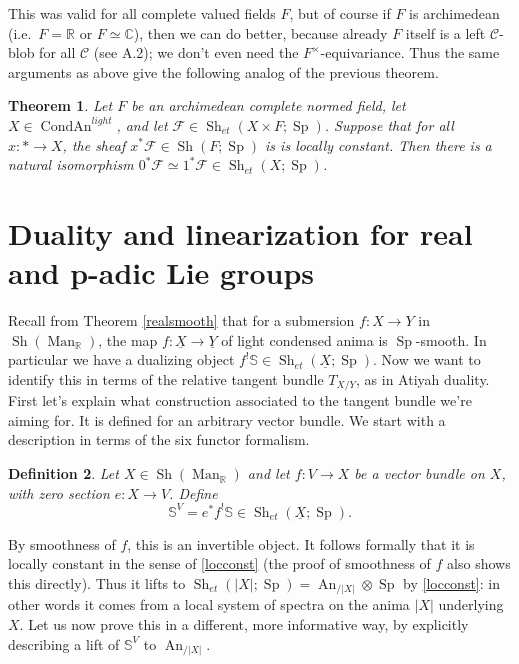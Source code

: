 \documentclass[12pt]{article}
\newtheorem{theorem}{Theorem}[section]
\newtheorem{definition}[theorem]{Definition}
\newcommand{\on}{\operatorname}
\newcommand{\mbb}{\mathbb}
\newcommand{\ul}{\underline}
\begin{document}
This was valid for all complete valued fields $F$, but of course if $F$ is archimedean (i.e.\ $F=\mathbb{R}$ or $F\simeq\mathbb{C}$), then we can do better, because already $F$ itself is a left $\mathcal{C}$-blob for all $\mathcal{C}$ (see \cite{LurieHA} A.2); we don't even need the $F^\times$-equivariance.  Thus the same arguments as above give the following analog of the previous theorem.

\begin{theorem}
Let $F$ be an \emph{archimedean} complete normed field, let $X\in\on{CondAn}^{light}$, and let $\mathcal{F}\in\on{Sh}_{et}(X\times F;\on{Sp})$.  Suppose that for all $x:\ast\rightarrow X$, the sheaf $x^\ast\mathcal{F}\in\on{Sh}(F;\on{Sp})$ is is locally constant.  Then there is a natural isomorphism $0^\ast\mathcal{F}\simeq 1^\ast\mathcal{F} \in \on{Sh}_{et}(X;\on{Sp})$.
\end{theorem}




\section{Duality and linearization for real and p-adic Lie groups}\label{dualsec}

Recall from Theorem \ref{realsmooth} that for a submersion $f:X\to Y$ in $\on{Sh}(\on{Man}_\mathbb{R})$, the map $f:\underline{X}\to\underline{Y}$ of light condensed anima is $\on{Sp}$-smooth.  In particular we have a dualizing object $f^!\mbb{S}\in \on{Sh}_{et}(\ul{X};\on{Sp})$.  Now we want to identify this in terms of the relative tangent bundle $T_{X/Y}$, as in Atiyah duality.  First let's explain what construction associated to the tangent bundle we're aiming for.  It is defined for an arbitrary vector bundle.  We start with a description in terms of the six functor formalism.

\begin{definition}
Let $X\in\on{Sh}(\on{Man}_\mbb{R})$ and let $f:V\to X$ be a vector bundle on $X$, with zero section $e:X \to V$.  Define
$$\mathbb{S}^V = e^\ast f^!\mbb{S} \in \on{Sh}_{et}(\ul{X};\on{Sp}).$$
\end{definition}

By smoothness of $f$, this is an invertible object.  It follows formally that it is locally constant in the sense of \ref{locconst} (the proof of smoothness of $f$ also shows this directly).  Thus it lifts to $\on{Sh}_{et}(|X|;\on{Sp}) = \on{An}_{/|X|}\otimes\on{Sp}$ by \ref{locconst}: in other words it comes from a local system of spectra on the anima $|X|$ underlying $X$.  Let us now prove this in a different, more informative way, by explicitly describing a lift of $\mbb{S}^V$ to $\on{An}_{/|X|}$.
\end{document}
